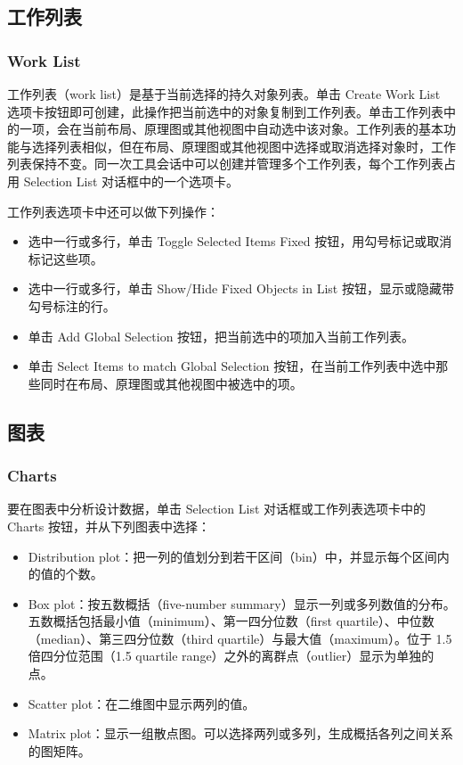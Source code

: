 \subsection{工作列表}
\subsubsection*{Work List}

工作列表（work list）是基于当前选择的持久对象列表。单击 Create Work List 选项卡按钮即可创建，此操作把当前选中的对象复制到工作列表。单击工作列表中的一项，会在当前布局、原理图或其他视图中自动选中该对象。工作列表的基本功能与选择列表相似，但在布局、原理图或其他视图中选择或取消选择对象时，工作列表保持不变。同一次工具会话中可以创建并管理多个工作列表，每个工作列表占用 Selection List 对话框中的一个选项卡。

工作列表选项卡中还可以做下列操作：
\begin{itemize}
  \item 选中一行或多行，单击 Toggle Selected Items Fixed 按钮，用勾号标记或取消标记这些项。
  \item 选中一行或多行，单击 Show/Hide Fixed Objects in List 按钮，显示或隐藏带勾号标注的行。
  \item 单击 Add Global Selection 按钮，把当前选中的项加入当前工作列表。
  \item 单击 Select Items to match Global Selection 按钮，在当前工作列表中选中那些同时在布局、原理图或其他视图中被选中的项。
\end{itemize}

\subsection{图表}
\subsubsection*{Charts}

要在图表中分析设计数据，单击 Selection List 对话框或工作列表选项卡中的 Charts 按钮，并从下列图表中选择：
\begin{itemize}
  \item Distribution plot：把一列的值划分到若干区间（bin）中，并显示每个区间内的值的个数。
  \item Box plot：按五数概括（five-number summary）显示一列或多列数值的分布。五数概括包括最小值（minimum）、第一四分位数（first quartile）、中位数（median）、第三四分位数（third quartile）与最大值（maximum）。位于 1.5 倍四分位范围（1.5 quartile range）之外的离群点（outlier）显示为单独的点。
  \item Scatter plot：在二维图中显示两列的值。
  \item Matrix plot：显示一组散点图。可以选择两列或多列，生成概括各列之间关系的图矩阵。
\end{itemize}

